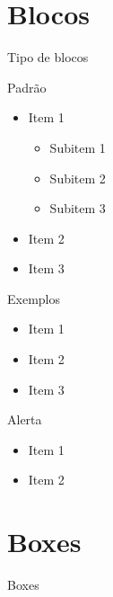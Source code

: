 \documentclass[table,xcolor=table]{apresentações/exemplo 2/IFMG-beamer}
\begin{document}
\section{Blocos}
\begin{frame}{Tipo de blocos}

\begin{block}{Padrão}
\begin{itemize}
  \item Item 1
  \begin{itemize}
      \item Subitem 1
      \item Subitem 2
      \item Subitem 3
  \end{itemize}
  \item Item 2
  \item Item 3
\end{itemize}
\end{block}

\pause

\begin{exampleblock}{Exemplos}
    \begin{itemize}
      \item Item 1
      \item Item 2
      \item Item 3
    \end{itemize}
\end{exampleblock}

\pause

\begin{alertblock}{Alerta}
    \begin{itemize}
      \item Item 1
       \item Item 2
    \end{itemize}
\end{alertblock}
\end{frame}

\section{Boxes}

\begin{frame}{Boxes}









\end{frame}
\end{document}
